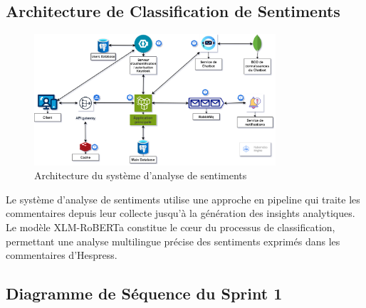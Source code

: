 \subsection{Architecture de Classification de Sentiments}

\begin{figure}[H]
\centering
\includegraphics[width=0.8\textwidth]{assets/images/architecture.png}
\caption{Architecture du système d'analyse de sentiments}
\label{fig:sentiment-architecture}
\end{figure}

Le système d'analyse de sentiments utilise une approche en pipeline qui traite les commentaires depuis leur collecte jusqu'à la génération des insights analytiques. Le modèle XLM-RoBERTa constitue le cœur du processus de classification, permettant une analyse multilingue précise des sentiments exprimés dans les commentaires d'Hespress.

\subsection{Diagramme de Séquence du Sprint 1}

